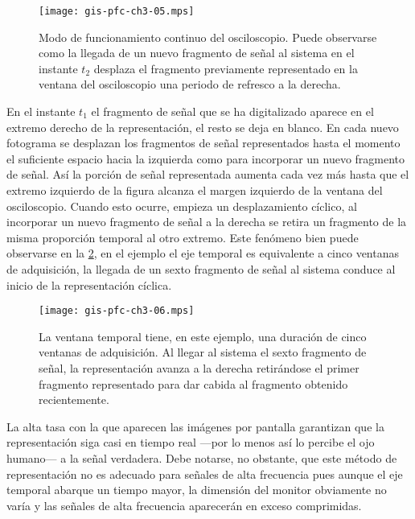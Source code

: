 \begin{figure}
	\begin{center}
		\texttt{[image: gis-pfc-ch3-05.mps]}
	\end{center}
	\caption[Modo de funcionamiento continuo]{Modo de funcionamiento continuo del osciloscopio. Puede observarse como la llegada de un nuevo fragmento de señal al sistema en el instante $t_2$ desplaza el fragmento previamente representado en la ventana del osciloscopio una periodo de refresco a la derecha.}
	\label{fig:modconti}
\end{figure}

En el instante $t_1$ el fragmento de señal que se ha digitalizado aparece en el extremo derecho de la representación, el resto se deja en blanco. En cada nuevo fotograma se desplazan los fragmentos de señal representados hasta el momento el suficiente espacio hacia la izquierda como para incorporar un nuevo fragmento de señal. Así la porción de señal representada aumenta cada vez más hasta que el extremo izquierdo de la figura alcanza el margen izquierdo de la ventana del osciloscopio. Cuando esto ocurre, empieza un desplazamiento cíclico, al incorporar un nuevo fragmento de señal a la derecha se retira un fragmento de la misma proporción temporal al otro extremo. Este fenómeno bien puede observarse en la \cref{fig:modcontii}, en el ejemplo el eje temporal es equivalente a cinco ventanas de adquisición, la llegada de un sexto fragmento de señal al sistema conduce al inicio de la representación cíclica.\par

\begin{figure}
	\begin{center}
		\texttt{[image: gis-pfc-ch3-06.mps]}
	\end{center}
	\caption[Modo de funcionamiento continuo]{La ventana temporal tiene, en este ejemplo, una duración de cinco ventanas de adquisición. Al llegar al sistema el sexto fragmento de señal, la representación avanza a la derecha retirándose el primer fragmento representado para dar cabida al fragmento obtenido recientemente.}
	\label{fig:modcontii}
\end{figure}

La alta tasa con la que aparecen las imágenes por pantalla garantizan que la representación siga casi en tiempo real ---por lo menos así lo percibe el ojo humano--- a la señal verdadera. Debe notarse, no obstante, que este método de representación no es adecuado para señales de alta frecuencia pues aunque el eje temporal abarque un tiempo mayor, la dimensión del monitor obviamente no varía y las señales de alta frecuencia aparecerán en exceso comprimidas.\par


